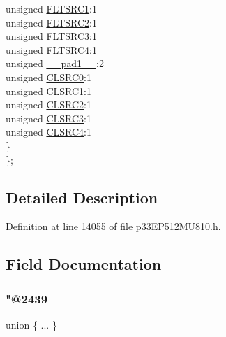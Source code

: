\begin{DoxyCompactItemize}
\begin{tabbing}
\>\>unsigned \hyperlink{structtag_f_c_l_c_o_n1_b_i_t_s_a7e2dde44582a2b4411afb97f93704738}{FLTSRC1}:1\\
\>\>unsigned \hyperlink{structtag_f_c_l_c_o_n1_b_i_t_s_a41a56979130beaf62e52443409af0daf}{FLTSRC2}:1\\
\>\>unsigned \hyperlink{structtag_f_c_l_c_o_n1_b_i_t_s_a919f99b1241a5f4d92f40778ec6b91a8}{FLTSRC3}:1\\
\>\>unsigned \hyperlink{structtag_f_c_l_c_o_n1_b_i_t_s_afedaf58b1e4d19481bb47b44b59ecbc3}{FLTSRC4}:1\\
\>\>unsigned \hyperlink{structtag_f_c_l_c_o_n1_b_i_t_s_acaf2d0924a107ec6e8d2e31febaf66f9}{\_\_pad1\_\_}:2\\
\>\>unsigned \hyperlink{structtag_f_c_l_c_o_n1_b_i_t_s_a0a945873cb44d41b241b83b08b599880}{CLSRC0}:1\\
\>\>unsigned \hyperlink{structtag_f_c_l_c_o_n1_b_i_t_s_a59f38630bf59c0035792456d75d03410}{CLSRC1}:1\\
\>\>unsigned \hyperlink{structtag_f_c_l_c_o_n1_b_i_t_s_a24cd8f779980ba4b721ab1d0d63648de}{CLSRC2}:1\\
\>\>unsigned \hyperlink{structtag_f_c_l_c_o_n1_b_i_t_s_a86b531e28879dfb3db317ce2147d381e}{CLSRC3}:1\\
\>\>unsigned \hyperlink{structtag_f_c_l_c_o_n1_b_i_t_s_a438bb199cbcc62bfd380ead48036accc}{CLSRC4}:1\\
\>\} \\
\}; \\

\end{tabbing}\end{DoxyCompactItemize}


\subsection{Detailed Description}


Definition at line 14055 of file p33\+E\+P512\+M\+U810.\+h.



\subsection{Field Documentation}
\mbox{\label{structtag_f_c_l_c_o_n1_b_i_t_s_a074f6788a43e087ed6ca6ec8fa250e73}} 
\subsubsection{\texorpdfstring{"@2439}{@2439}}
{\footnotesize\ttfamily union \{ ... \} }

